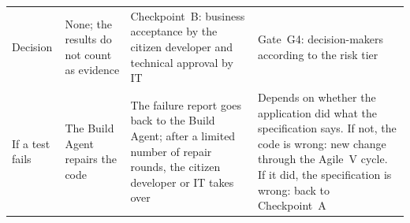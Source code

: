 \documentclass[10pt,a4paper]{article}
\begin{document}
\begin{table}[htbp]
\begin{tabularx}{\textwidth}{>{\raggedright\arraybackslash}p{2.4cm} Y Y Y}
    \addlinespace
    Decision
        & None; the results do not count as evidence
        & Checkpoint~B: business acceptance by the citizen developer and
          technical approval by IT
        & Gate~G4: decision-makers according to the risk tier \\
    \addlinespace
    If a test fails
        & The Build Agent repairs the code
        & The failure report goes back to the Build Agent; after a limited
          number of repair rounds, the citizen developer or IT takes over
        & Depends on whether the application did what the specification
          says. If not, the code is wrong: new change through the Agile~V
          cycle. If it did, the specification is wrong: back to
          Checkpoint~A \\
    \bottomrule
    \end{tabularx}
\end{table}
\end{document}
